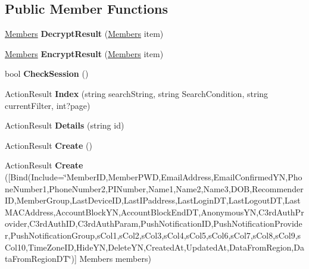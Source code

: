 \subsection*{Public Member Functions}
\begin{DoxyCompactItemize}
\item 
\hyperlink{a00145}{Members} {\bfseries Decrypt\+Result} (\hyperlink{a00145}{Members} item)\hypertarget{a00146_a48d4db5cd0226332091372d96645da00}{}\label{a00146_a48d4db5cd0226332091372d96645da00}

\item 
\hyperlink{a00145}{Members} {\bfseries Encrypt\+Result} (\hyperlink{a00145}{Members} item)\hypertarget{a00146_acdb55df82bf06c3c8d276b4f48a6c100}{}\label{a00146_acdb55df82bf06c3c8d276b4f48a6c100}

\item 
bool {\bfseries Check\+Session} ()\hypertarget{a00146_a65c99342c001f825d717f1a7533c188d}{}\label{a00146_a65c99342c001f825d717f1a7533c188d}

\item 
Action\+Result {\bfseries Index} (string search\+String, string Search\+Condition, string current\+Filter, int?page)\hypertarget{a00146_a2bd03c681454412335c7c640a18bf310}{}\label{a00146_a2bd03c681454412335c7c640a18bf310}

\item 
Action\+Result {\bfseries Details} (string id)\hypertarget{a00146_af39759700dc355ea52b4ff0e9e1a5da0}{}\label{a00146_af39759700dc355ea52b4ff0e9e1a5da0}

\item 
Action\+Result {\bfseries Create} ()\hypertarget{a00146_abfb2c19c8dc27ee47e2e8c1fa0ab4c3c}{}\label{a00146_abfb2c19c8dc27ee47e2e8c1fa0ab4c3c}

\item 
Action\+Result {\bfseries Create} (\mbox{[}Bind(Include=\char`\"{}Member\+ID,Member\+P\+WD,Email\+Address,Email\+Confirmed\+YN,Phone\+Number1,Phone\+Number2,P\+I\+Number,Name1,Name2,Name3,D\+OB,Recommender\+ID,Member\+Group,Last\+Device\+ID,Last\+I\+Paddress,Last\+Login\+DT,Last\+Logout\+DT,Last\+M\+A\+C\+Address,Account\+Block\+YN,Account\+Block\+End\+DT,Anonymous\+YN,C3rd\+Auth\+Provider,C3rd\+Auth\+ID,C3rd\+Auth\+Param,Push\+Notification\+ID,Push\+Notification\+Provider,Push\+Notification\+Group,s\+Col1,s\+Col2,s\+Col3,s\+Col4,s\+Col5,s\+Col6,s\+Col7,s\+Col8,s\+Col9,s\+Col10,Time\+Zone\+ID,Hide\+YN,Delete\+YN,Created\+At,Updated\+At,Data\+From\+Region,Data\+From\+Region\+DT\char`\"{})\mbox{]} Members members)\hypertarget{a00146_aa9708584a1c400fa3f47df43d53f364b}{}\label{a00146_aa9708584a1c400fa3f47df43d53f364b}


\end{DoxyCompactItemize}
